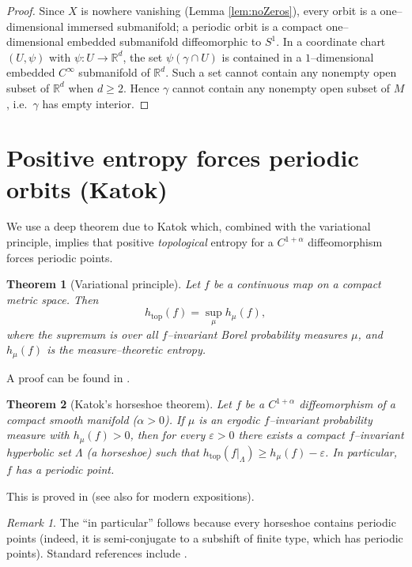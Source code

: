 \documentclass[11pt]{article}
\newtheorem{theorem}{Theorem}
\theoremstyle{definition}
\theoremstyle{remark}
\newtheorem{remark}{Remark}
\newcommand{\htop}{h_{\mathrm{top}}}
\begin{document}
\begin{proof}
Since $X$ is nowhere vanishing (Lemma \ref{lem:noZeros}), every orbit is a one--dimensional immersed submanifold;
a periodic orbit is a compact one--dimensional embedded submanifold diffeomorphic to $S^1$.
In a coordinate chart $(U,\psi)$ with $\psi:U\to \mathbb{R}^d$, the set $\psi(\gamma\cap U)$ is contained in a
$1$--dimensional embedded $C^\infty$ submanifold of $\mathbb{R}^d$. Such a set cannot contain any nonempty open subset of
$\mathbb{R}^d$ when $d\ge 2$. Hence $\gamma$ cannot contain any nonempty open subset of $M$, i.e.\ $\gamma$ has empty interior.
\end{proof}

\section{Positive entropy forces periodic orbits (Katok)}

We use a deep theorem due to Katok which, combined with the variational principle, implies that positive \emph{topological}
entropy for a $C^{1+\alpha}$ diffeomorphism forces periodic points.

\begin{theorem}[Variational principle]\label{thm:variational}
Let $f$ be a continuous map on a compact metric space. Then
\[
\htop(f)=\sup_{\mu} h_\mu(f),
\]
where the supremum is over all $f$--invariant Borel probability measures $\mu$, and $h_\mu(f)$ is the measure--theoretic entropy.
\end{theorem}

A proof can be found in \cite[Theorem 8.6]{Walters}.

\begin{theorem}[Katok's horseshoe theorem]\label{thm:katok}
Let $f$ be a $C^{1+\alpha}$ diffeomorphism of a compact smooth manifold ($\alpha>0$).
If $\mu$ is an ergodic $f$--invariant probability measure with $h_\mu(f)>0$, then for every $\varepsilon>0$
there exists a compact $f$--invariant hyperbolic set $\Lambda$ (a horseshoe) such that
$\htop(f|_\Lambda)\ge h_\mu(f)-\varepsilon$.
In particular, $f$ has a periodic point.
\end{theorem}

This is proved in \cite[Theorem~1]{KatokIHES} (see also \cite[Chapter~18]{KH} for modern expositions).

\begin{remark}\label{rem:periodicPoint}
The ``in particular'' follows because every horseshoe contains periodic points (indeed, it is semi-conjugate to a
subshift of finite type, which has periodic points). Standard references include \cite[\S 18.6]{KH}.
\end{remark}
\end{document}
